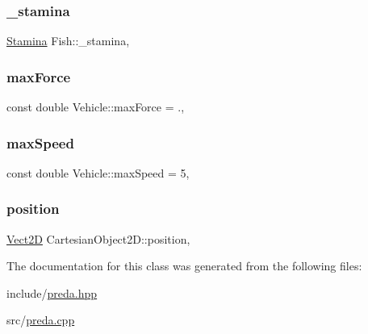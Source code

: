 \subsubsection{\texorpdfstring{\+\_\+stamina}{\_stamina}}
{\footnotesize\ttfamily \hyperlink{classStamina}{Stamina} Fish\+::\+\_\+stamina\hspace{0.3cm}{\ttfamily [protected]}, {\ttfamily [inherited]}}

\mbox{\label{classVehicle_a95c56790e3dc52ab0fa54c279920be54_a95c56790e3dc52ab0fa54c279920be54}} 
\subsubsection{\texorpdfstring{max\+Force}{maxForce}}
{\footnotesize\ttfamily const double Vehicle\+::max\+Force = .\hspace{0.3cm}{\ttfamily [static]}, {\ttfamily [inherited]}}

\mbox{\label{classVehicle_aab47c62e89baa5b7e52c2292451fbcb6_aab47c62e89baa5b7e52c2292451fbcb6}} 
\subsubsection{\texorpdfstring{max\+Speed}{maxSpeed}}
{\footnotesize\ttfamily const double Vehicle\+::max\+Speed = 5\hspace{0.3cm}{\ttfamily [static]}, {\ttfamily [inherited]}}

\mbox{\label{classCartesianObject2D_ae02ec6ed11f9bfc0c748da033d6a32f9_ae02ec6ed11f9bfc0c748da033d6a32f9}} 
\subsubsection{\texorpdfstring{position}{position}}
{\footnotesize\ttfamily \hyperlink{classVect2D}{Vect2D} Cartesian\+Object2\+D\+::position\hspace{0.3cm}{\ttfamily [protected]}, {\ttfamily [inherited]}}



The documentation for this class was generated from the following files\+:\begin{DoxyCompactItemize}
\item 
include/\hyperlink{preda_8hpp}{preda.\+hpp}\item 
src/\hyperlink{preda_8cpp}{preda.\+cpp}\end{DoxyCompactItemize}
